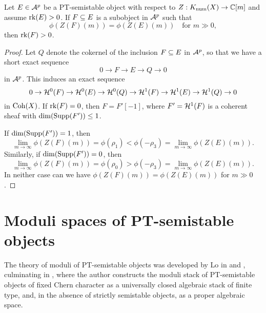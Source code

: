 \begin{lem}\label{subobjposrank}
    Let $E \in \mathcal{A}^p$ be a PT-semistable object with respect to $Z: K_{\mathrm{num}}(X) \to \mathbb{C}[m]$ and assume $\operatorname{\mathrm{rk}}(E) > 0$. If $F \subseteq E$ is a subobject in $\mathcal{A}^p$ such that 
    \[ \phi(Z(F)(m)) = \phi(Z(E)(m)) \quad \text{for } m \gg 0, \]
    then $\operatorname{\mathrm{rk}}(F) > 0$.
\end{lem}
\begin{proof}
    Let $Q$ denote the cokernel of the inclusion $F \subseteq E$ in $\mathcal{A}^p$, so that we have a short exact sequence
    \[ 0 \to F \to E \to Q \to 0 \]
    in $\mathcal{A}^p$. This induces an exact sequence
    \[ 0 \to \mathcal{H}^0(F) \to \mathcal{H}^0(E) \to \mathcal{H}^0(Q) \to \mathcal{H}^1(F) \to \mathcal{H}^1(E) \to \mathcal{H}^1(Q) \to 0 \]
    in $\operatorname{\mathrm{Coh}}(X)$. If $\operatorname{\mathrm{rk}}(F) = 0$, then $F = F'[-1]$, where $F' = \mathcal{H}^1(F)$ is a coherent sheaf with $\dim(\operatorname{\mathrm{Supp}}(F')) \le 1$. 
    
    If $\dim(\operatorname{\mathrm{Supp}}(F')) = 1$, then
    \[ \lim_{m \to \infty} \phi(Z(F)(m)) = \phi(\rho_1) < \phi(-\rho_3) = \lim_{m \to \infty} \phi(Z(E)(m)). \]
    Similarly, if $\dim(\operatorname{\mathrm{Supp}}(F')) = 0$, then
    \[ \lim_{m \to \infty} \phi(Z(F)(m)) = \phi(\rho_0) > \phi(-\rho_3) = \lim_{m \to \infty} \phi(Z(E)(m)). \]
    In neither case can we have $\phi(Z(F)(m)) = \phi(Z(E)(m))$ for $m \gg 0$. 
\end{proof}

\section{Moduli spaces of PT-semistable objects}


The theory of moduli of PT-semistable objects was developed by Lo in \cite{lo-PT1} and \cite{lo-PT2}, culminating in \cite[Theorem 1.1]{lo-PT2}, where the author constructs the moduli stack of PT-semistable objects of fixed Chern character as a universally closed algebraic stack of finite type, and, in the absence of strictly semistable objects, as a proper algebraic space. 

